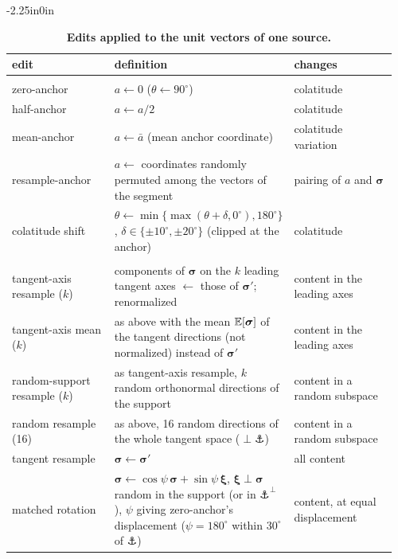 \begin{table}[!ht]
\begin{adjustwidth}{-2.25in}{0in}
\renewcommand{\baselinestretch}{1}
\caption{{\bf Edits applied to the unit vectors of one source.}}
\label{tab:operators}
\centering\footnotesize
\setlength{\tabcolsep}{3pt}
\begin{tabular}{@{}>{\raggedright\arraybackslash}p{0.27\linewidth}>{\raggedright\arraybackslash}p{0.42\linewidth}>{\raggedright\arraybackslash}p{0.27\linewidth}@{}}
\toprule
\textbf{edit} & \textbf{definition} & \textbf{changes} \\
\midrule
\multicolumn{3}{@{}l}{\emph{Location: $\bm{\sigma}$ kept}} \\
zero-anchor          & $a\leftarrow0$ ($\theta\leftarrow90^\circ$)                         & colatitude \\
half-anchor          & $a\leftarrow a/2$                                                   & colatitude \\
mean-anchor          & $a\leftarrow\bar{a}$ (mean anchor coordinate)                        & colatitude variation \\
resample-anchor      & $a\leftarrow$ coordinates randomly permuted among the vectors of the segment & pairing of $a$ and $\bm{\sigma}$ \\
colatitude shift     & $\theta\leftarrow\min\{\max(\theta+\delta,0^\circ),180^\circ\}$, $\delta\in\{\pm10^\circ,\pm20^\circ\}$ (clipped at the anchor) & colatitude \\
\multicolumn{3}{@{}l}{\emph{Content: $a$ kept}} \\
tangent-axis resample ($k$) & components of $\bm{\sigma}$ on the $k$ leading tangent axes $\leftarrow$ those of $\bm{\sigma}'$; renormalized & content in the leading axes \\
tangent-axis mean ($k$) & as above with the mean $\mathbb{E}[\bm{\sigma}]$ of the tangent directions (not normalized) instead of $\bm{\sigma}'$ & content in the leading axes \\
random-support resample ($k$) & as tangent-axis resample, $k$ random orthonormal directions of the support & content in a random subspace \\
random resample (16) & as above, 16 random directions of the whole tangent space ($\perp\anchor$) & content in a random subspace \\
tangent resample     & $\bm{\sigma}\leftarrow\bm{\sigma}'$                                  & all content \\
matched rotation     & $\bm{\sigma}\leftarrow\cos\psi\,\bm{\sigma}+\sin\psi\,\bm{\xi}$, $\bm{\xi}\perp\bm{\sigma}$ random in the support (or in $\anchor^{\perp}$), $\psi$ giving zero-anchor's displacement ($\psi=180^\circ$ within $30^\circ$ of $\anchor$) & content, at equal displacement \\

\end{tabular}
\end{adjustwidth}
\end{table}
